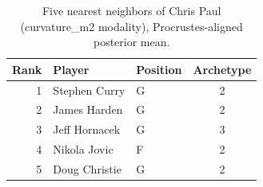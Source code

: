 \begin{table}[htbp]
  \centering\small
  \begin{tabular}{rllc}
    \toprule
    Rank & Player & Position & Archetype \\
    \midrule
    1 & Stephen Curry & G & 2 \\
    2 & James Harden & G & 2 \\
    3 & Jeff Hornacek & G & 3 \\
    4 & Nikola Jovic & F & 2 \\
    5 & Doug Christie & G & 2 \\
    \bottomrule
  \end{tabular}
  \caption{Five nearest neighbors of Chris Paul (curvature_m2 modality), Procrustes-aligned posterior mean.}
  \label{tab:Chris_Paul_neighbors_curvature_m2}
\end{table}

